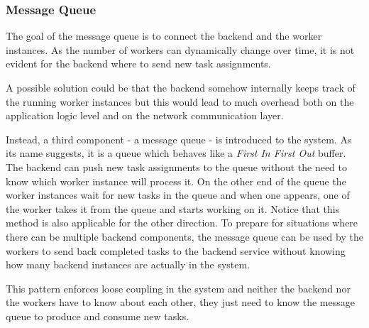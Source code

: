 \subsubsection{Message Queue} \label{design-message-queue}


The goal of the message queue is to connect the backend and the worker instances. As the number of workers can dynamically change over time, it is not evident for the backend where to send new task assignments.

A possible solution could be that the backend somehow internally keeps track of the running worker instances but this would lead to much overhead both on the application logic level and on the network communication layer.

Instead, a third component - a message queue - is introduced to the system. As its name suggests, it is a queue which behaves like a \emph{First In First Out} buffer. The backend can push new task assignments to the queue without the need to know which worker instance will process it. On the other end of the queue the worker instances wait for new tasks in the queue and when one appears, one of the worker takes it from the queue and starts working on it. Notice that this method is also applicable for the other direction. To prepare for situations where there can be multiple backend components, the message queue can be used by the workers to send back completed tasks to the backend service without knowing how many backend instances are actually in the system.

This pattern enforces loose coupling in the system and neither the backend nor the workers have to know about each other, they just need to know the message queue to produce and consume new tasks. 

